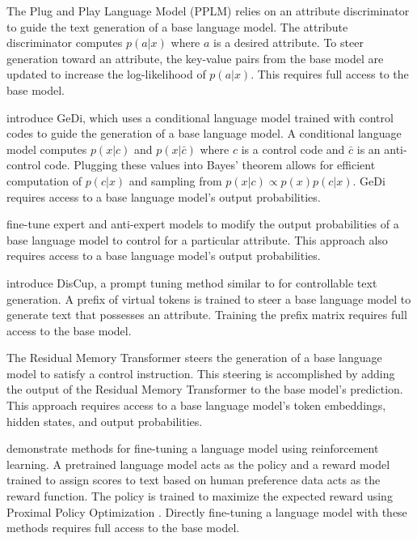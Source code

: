 \documentclass[phd,electronic,oneside,twosidetoc,letterpaper,chaptercenter,parttop,lof]{byumsphd}
\begin{document}
The Plug and Play Language Model (PPLM) \cite{dathathri2020plug} relies on an attribute discriminator to guide the text generation of a base language model.
The attribute discriminator computes \(p(a | x)\) where \(a\) is a desired attribute.
To steer generation toward an attribute, the key-value pairs from the base model are updated to increase the log-likelihood of \(p(a | x)\).
This requires full access to the base model.

\cite{krause2021gedi} introduce GeDi, which uses a conditional language model trained with control codes to guide the generation of a base language model. 
A conditional language model computes \(p(x | c)\) and \(p(x | \bar{c})\) where \(c\) is a control code and \(\bar{c}\) is an anti-control code.
Plugging these values into Bayes' theorem allows for efficient computation of \(p(c | x)\) and sampling from \(p(x | c) \propto p(x) p(c | x)\).
GeDi requires access to a base language model's output probabilities.

\cite{liu2021dexpert} fine-tune expert and anti-expert models to modify the output probabilities of a base language model to control for a particular attribute.
This approach also requires access to a base language model's output probabilities.

\cite{zhang2022discup} introduce DisCup, a prompt tuning method similar to \cite{li2021prefix} for controllable text generation. 
A prefix of virtual tokens is trained to steer a base language model to generate text that possesses an attribute. 
Training the prefix matrix requires full access to the base model.

The Residual Memory Transformer \citep{zhang2023rmt} steers the generation of a base language model to satisfy a control instruction.
This steering is accomplished by adding the output of the Residual Memory Transformer to the base model's prediction.
This approach requires access to a base language model's token embeddings, hidden states, and output probabilities. 

\citet{ziegler2019preferences} demonstrate methods for fine-tuning a language model using reinforcement learning.
A pretrained language model acts as the policy and a reward model trained to assign scores to text based on human preference data acts as the reward function.
The policy is trained to maximize the expected reward using Proximal Policy Optimization \citep{schulman2017ppo}.
Directly fine-tuning a language model with these methods requires full access to the base model.
\end{document}
